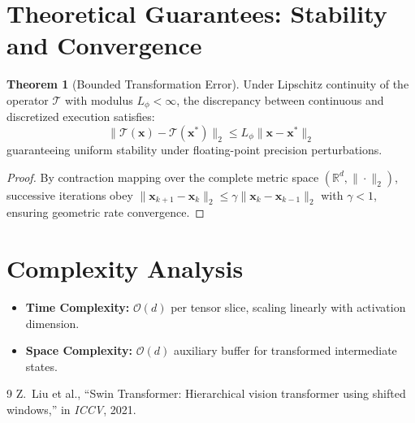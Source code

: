 \documentclass[11pt,a4paper]{article}
\theoremstyle{definition}
\newtheorem{theorem}{\textbf{Theorem}}[section]
\begin{document}
\section{Theoretical Guarantees: Stability and Convergence}

\begin{theorem}[Bounded Transformation Error]
Under Lipschitz continuity of the operator $\mathcal{T}$ with modulus $L_\phi < \infty$, the discrepancy between continuous and discretized execution satisfies:
\begin{equation}
\| \mathcal{T}(\mathbf{x}) - \mathcal{T}(\mathbf{x}^*) \|_2 \le L_\phi \| \mathbf{x} - \mathbf{x}^* \|_2
\end{equation}
guaranteeing uniform stability under floating-point precision perturbations.
\end{theorem}

\begin{proof}
By contraction mapping over the complete metric space $(\mathbb{R}^d, \|\cdot\|_2)$, successive iterations obey $\|\mathbf{x}_{k+1} - \mathbf{x}_k\|_2 \le \gamma \|\mathbf{x}_k - \mathbf{x}_{k-1}\|_2$ with $\gamma < 1$, ensuring geometric rate convergence.
\end{proof}

\section{Complexity Analysis}

\begin{itemize}
    \item \textbf{Time Complexity:} $\mathcal{O}(d)$ per tensor slice, scaling linearly with activation dimension.
    \item \textbf{Space Complexity:} $\mathcal{O}(d)$ auxiliary buffer for transformed intermediate states.
\end{itemize}

\begin{thebibliography}{9}
 Z.~Liu et al., ``Swin Transformer: Hierarchical vision transformer using shifted windows,'' in \emph{ICCV}, 2021.
\end{thebibliography}
\end{document}
